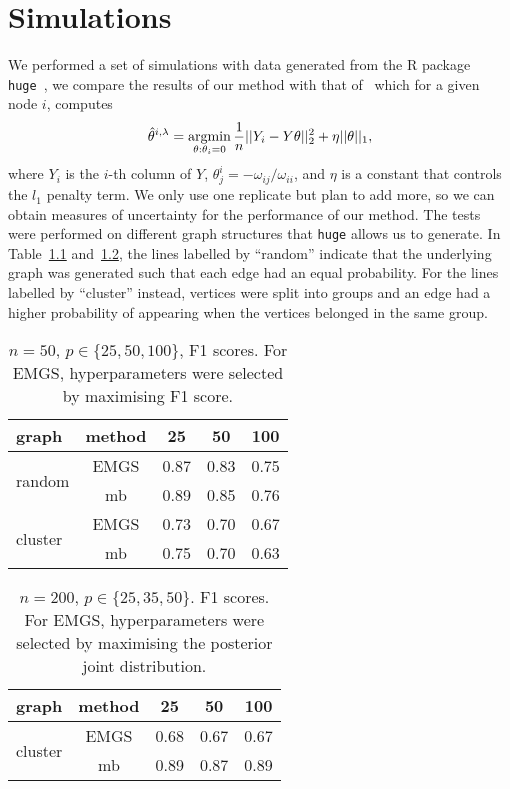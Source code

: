 \documentclass[a4paper, 11pt, oneside]{report}
\DeclareMathOperator{\argmin}{argmin}
\newcommand{\1}{\mathds{1}}
\begin{document}
\chapter{Simulations}
We performed a set of simulations with data generated from the R package
\texttt{huge}~\parencite{huge2020}, we compare the results of our method with that of~\cite{mein2006} which for a given node $i$, computes
\[\hat{\theta}^{i, \lambda} = \argmin\displaylimits_{\theta : \theta_i = 0}\frac{1}{n} ||Y_i - Y \theta||_2^2 + \eta ||\theta||_1,\]
where $Y_i$ is the $i$-th column of $Y$, $\theta_j^i = -\omega_{ij}/\omega_{ii}$, and $\eta$ is a constant that controls the $l_1$ penalty term.
We only use one replicate but plan to add more, so we can obtain measures of uncertainty for the performance of our method.
The tests were performed on different graph structures that \texttt{huge} allows us to generate.
In Table~\ref{tab:cheat} and~\ref{tab:honest}, the lines labelled by ``random'' indicate that the
underlying graph was generated such that each edge had an equal probability. For the lines labelled by ``cluster'' instead, vertices were split
into groups and an edge had a higher probability of appearing when the vertices
belonged in the same group.
\begin{table}
	\centering
	\small
	\begin{tabular}{lcccc}
		\toprule
		graph                    & method & 25   & 50   & 100  \\
		\midrule
		\multirow{2}{*}{random}  & EMGS   & 0.87 & 0.83 & 0.75 \\
		                         & mb     & 0.89 & 0.85 & 0.76 \\
		\midrule
		\multirow{2}{*}{cluster} & EMGS   & 0.73 & 0.70 & 0.67 \\
		                         & mb     & 0.75 & 0.70 & 0.63 \\
		\bottomrule
	\end{tabular}
	\caption{$n=50$, $p \in \{25, 50, 100\}$, F1 scores. For EMGS, hyperparameters were selected by maximising F1 score.}\label{tab:cheat}
\end{table}
\begin{table}
	\centering
	\small
	\begin{tabular}{lcccc}
		\toprule
		graph                    & method & 25   & 50   & 100  \\
		\midrule
		\multirow{2}{*}{cluster} & EMGS   & 0.68 & 0.67 & 0.67 \\
		                         & mb     & 0.89 & 0.87 & 0.89 \\
		\bottomrule
	\end{tabular}
	\caption{$n=200$, $p \in \{25, 35, 50\}$. F1 scores. For EMGS, hyperparameters were selected by maximising the posterior joint distribution.}\label{tab:honest}
\end{table}
\end{document}
